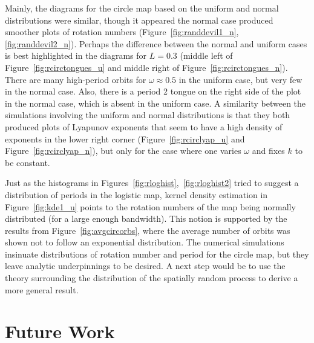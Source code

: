 Mainly, the diagrams for the circle map based on the uniform and
normal distributions were similar, though it appeared the normal
case produced smoother plots of rotation numbers
(Figure~\ref{fig:randdevil1_n}, \ref{fig:randdevil2_n}). Perhaps the
difference between the normal and uniform cases is best highlighted in
the diagrams for $L = 0.3$ (middle left of
Figure~\ref{fig:rcirctongues_u} and middle right of
Figure~\ref{fig:rcirctongues_n}). There are many high-period orbits
for $\omega\approx 0.5$ in the uniform case, but very
few in the normal case. Also, there is a period 2 tongue on the right
side of the plot in the normal case, which is absent in the uniform
case. A similarity between the simulations involving the uniform and normal
distributions is that they both produced plots of Lyapunov exponents that seem to have a
high density of exponents in the lower right corner
(Figure~\ref{fig:rcirclyap_u} and Figure~\ref{fig:rcirclyap_n}), but
only for the case where one varies $\omega$ and fixes $k$ to be
constant.

Just as the histograms in Figures~\ref{fig:rloghist},~\ref{fig:rloghist2} tried to suggest a
distribution of periods in the logistic map, kernel density estimation
in Figure~\ref{fig:kde1_u} points to the rotation numbers of the map
being normally distributed (for a large enough bandwidth). This notion
is supported by the results from Figure~\ref{fig:avgcircorbs}, where
the average number of orbits was shown not to follow an exponential
distribution. The numerical simulations insinuate distributions of
rotation number and period for the circle map, but they leave analytic
underpinnings to be desired. A next step would be to use the theory
surrounding the distribution of the spatially random process to derive
a more general result.
\section{Future Work}
